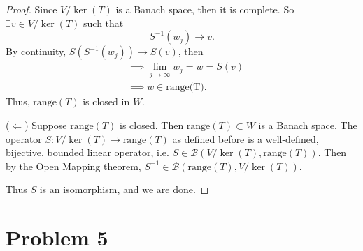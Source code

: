 \documentclass{article}
\begin{document}
\begin{proof}
	Since $V/\ker{(T)}$ is a Banach space, then it is complete. So $\exists v\in V/\ker{(T)}$ such that
	\begin{equation}
		S^{-1}(w_j) \rightarrow v.
	\end{equation}
	By continuity, $S\left(S^{-1}(w_j)\right)\rightarrow S(v)$, then
	\begin{align}
		&\implies \lim_{j\to\infty} w_j = w = S(v)\\
		&\implies w \in \textrm{range(T)}.
	\end{align}
	Thus, $\textrm{range}(T)$ is closed in $W$.
	
	($\Leftarrow$) Suppose $\textrm{range}(T)$ is closed. Then $\textrm{range}(T)\subset W$ is a Banach space. The operator $S: V/\ker{(T)} \longrightarrow \textrm{range}(T)$ as defined before is a well-defined, bijective, bounded linear operator, i.e. $S\in\mathcal{B}(V/\ker{(T)}, \textrm{range}(T))$.
	Then by the Open Mapping theorem, $S^{-1}\in \mathcal{B}(\textrm{range}(T), V/\ker{(T)})$.
	
	Thus $S$ is an isomorphism, and we are done.
\end{proof}

\section*{Problem 5}
\end{document}

